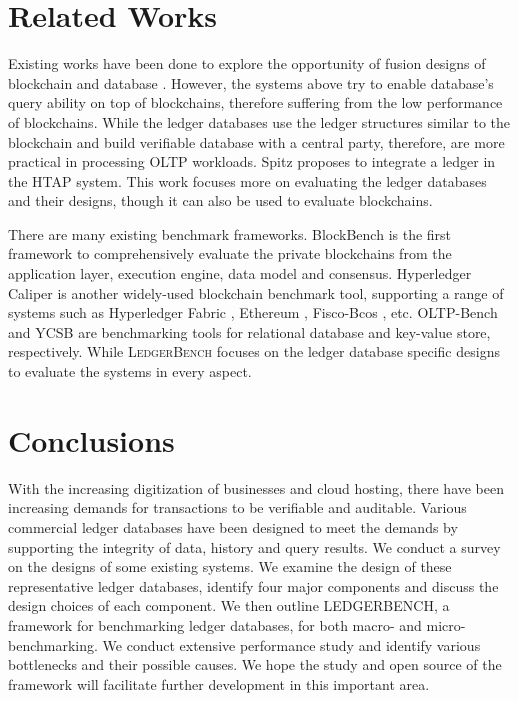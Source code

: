 \documentclass[11pt,dvipdfm]{article}
\newcommand{\systemname}{\textsc{LedgerBench}\xspace}
\begin{document}
\section{Related Works}
\label{sec:related}

Existing works have been done to explore the opportunity of fusion designs of blockchain and database \cite{bc&ddbms,provenance, veritas, bigchaindb, blockchaindb, hybridblockchain, bcbook, untanglingbc}.
However, the systems above try to enable database's query ability on top of blockchains, therefore suffering from the low performance of blockchains. While the ledger databases \cite{qldb, ledgerdb, sqlledger} use the ledger structures similar to the blockchain and build verifiable database with a central party, therefore, are more practical in processing OLTP workloads. Spitz \cite{spitz} proposes to integrate a ledger in the HTAP system. This work focuses more on evaluating the ledger databases and their designs, though it can also be used to evaluate blockchains.

There are many existing benchmark frameworks. BlockBench \cite{blockbench} is the first framework to comprehensively evaluate the private blockchains from the application layer, execution engine, data model and consensus. Hyperledger Caliper \cite{caliper} is another widely-used blockchain benchmark tool, supporting a range of systems such as Hyperledger Fabric \cite{hyperledger}, Ethereum \cite{ethereum}, Fisco-Bcos \cite{fisco}, etc.
OLTP-Bench \cite{oltpbench} and YCSB \cite{ycsb} are benchmarking tools for relational database and key-value store, respectively.
While \systemname focuses on the ledger database specific designs to evaluate the systems in every aspect.


\section{Conclusions}
With the increasing digitization of businesses and cloud hosting, there have been increasing demands for transactions to be verifiable and auditable.
Various commercial ledger databases have been designed to meet the demands by supporting the integrity of data, history and query results. 
We conduct a survey on the designs of some existing systems. We examine the design of
these representative ledger databases,  identify four major components and discuss the design choices of each component. 
We then outline LEDGERBENCH, a framework for benchmarking ledger databases, for both macro-
and micro-benchmarking.
We conduct extensive performance study and identify various bottlenecks and their possible causes.  We hope the study and open source of the framework will facilitate further development in this important area.
\end{document}
